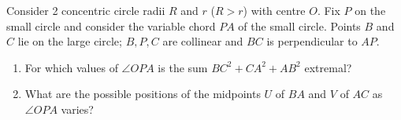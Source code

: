 Consider 2 concentric circle radii $ R$ and  $ r$ ($ R > r$) with centre $ O.$ Fix $ P$ on the small circle and consider the variable chord $ PA$ of the small circle. Points $ B$ and $ C$ lie on the large circle; $ B,P,C$ are collinear and $ BC$ is perpendicular to $ AP.$

\begin{enumerate}[label = (\alph*)]
	\item For which values of $ \angle OPA$ is the sum $ BC^2 + CA^2 + AB^2$ extremal?
	\item What are the possible positions of the midpoints $ U$ of $ BA$ and $ V$ of $ AC$ as $ \angle OPA$ varies?
\end{enumerate}
